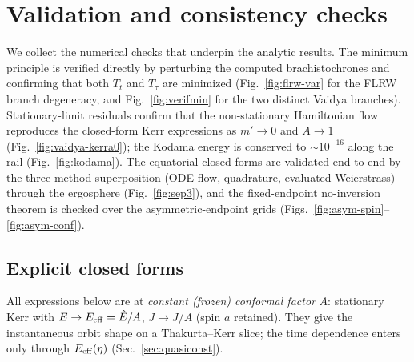 \documentclass[12pt]{iopart}
\newcommand{\Ehat}{\hat E}
\begin{document}
\appendix
\section{Validation and consistency checks}
\label{app:validation}
We collect the numerical checks that underpin the analytic results. The
minimum principle is verified directly by perturbing the computed
brachistochrones and confirming that both $T_t$ and $T_\tau$ are minimized
(Fig.~\ref{fig:flrw-var} for the FLRW branch degeneracy, and
Fig.~\ref{fig:verifmin} for the two distinct Vaidya branches). Stationary-limit
residuals confirm that the non-stationary
Hamiltonian flow reproduces the closed-form Kerr expressions as $m'\to0$ and
$A\to1$ (Fig.~\ref{fig:vaidya-kerra0}); the Kodama energy is conserved to
$\sim10^{-16}$ along the rail (Fig.~\ref{fig:kodama}). The equatorial closed
forms are validated end-to-end by the three-method superposition
(ODE flow, quadrature, evaluated Weierstrass) through the ergosphere
(Fig.~\ref{fig:sep3}), and the fixed-endpoint no-inversion theorem is
checked over the asymmetric-endpoint grids (Figs.~\ref{fig:asym-spin}--%
\ref{fig:asym-conf}).

\subsection{Explicit closed forms}
\label{app:explicit}

All expressions below are at \emph{constant (frozen) conformal factor} $A$:
stationary Kerr with $E\to E_{\rm eff}=\Ehat/A$, $J\to J/A$ (spin $a$ retained). They give
the instantaneous orbit shape on a Thakurta--Kerr slice; the time dependence
enters only through $E_{\rm eff}(\eta)$ (Sec.~\ref{sec:quasiconst}).
\end{document}
